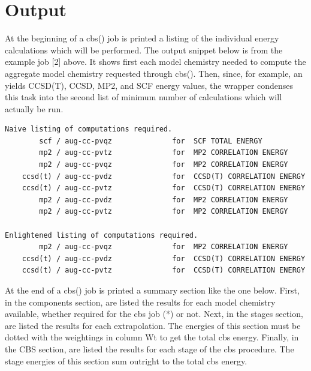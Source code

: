\documentclass[letterpaper,10pt,english]{sphinxmanual}
\begin{document}
\section{Output}
\label{index:id1}
At the beginning of a cbs() job is printed a listing of the individual
energy calculations which will be performed. The output snippet below is
from the example job {[}2{]} above. It shows first each model chemistry needed
to compute the aggregate model chemistry requested through cbs(). Then,
since, for example, an  yields CCSD(T), CCSD, MP2,
and SCF energy values, the wrapper condenses this task into the second
list of minimum number of calculations which will actually be run.

\begin{Verbatim}[commandchars=\\\{\}]
Naive listing of computations required.
        scf / aug-cc-pvqz              for  SCF TOTAL ENERGY
        mp2 / aug-cc-pvtz              for  MP2 CORRELATION ENERGY
        mp2 / aug-cc-pvqz              for  MP2 CORRELATION ENERGY
    ccsd(t) / aug-cc-pvdz              for  CCSD(T) CORRELATION ENERGY
    ccsd(t) / aug-cc-pvtz              for  CCSD(T) CORRELATION ENERGY
        mp2 / aug-cc-pvdz              for  MP2 CORRELATION ENERGY
        mp2 / aug-cc-pvtz              for  MP2 CORRELATION ENERGY

Enlightened listing of computations required.
        mp2 / aug-cc-pvqz              for  MP2 CORRELATION ENERGY
    ccsd(t) / aug-cc-pvdz              for  CCSD(T) CORRELATION ENERGY
    ccsd(t) / aug-cc-pvtz              for  CCSD(T) CORRELATION ENERGY
\end{Verbatim}

At the end of a cbs() job is printed a summary section like the one below. First,
in the components section, are listed the results for each model chemistry available, whether
required for the cbs job (*) or not. Next, in the stages section, are listed the results for
each extrapolation. The energies of this section must be dotted with the weightings in column Wt
to get the total cbs energy. Finally, in the CBS section, are listed the results for each stage
of the cbs procedure. The stage energies of this section sum outright to the total cbs energy.
\end{document}
